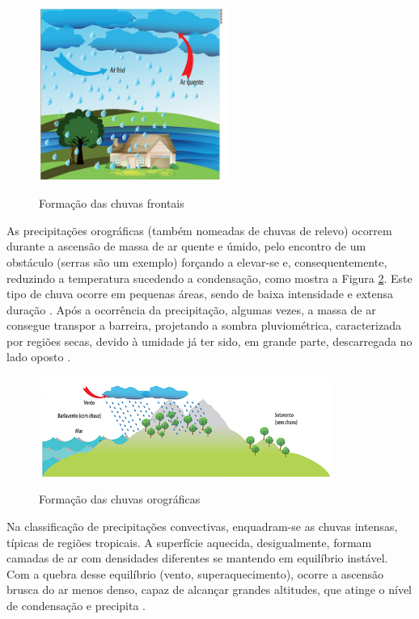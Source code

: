 \begin{figure}[h]
    \caption{Formação das chuvas frontais}
    \centering
    \includegraphics[width=0.55\textwidth]{Textuais/Figuras/chuva-frontal.png}
    \label{fig:frontal}
\end{figure}

As precipitações orográficas (também nomeadas de chuvas de relevo) ocorrem durante a ascensão de massa de ar quente e úmido, pelo encontro de um obstáculo (serras são um exemplo) forçando a elevar-se e, consequentemente, reduzindo a temperatura sucedendo a condensação, como mostra a Figura \ref{fig:orografica}. Este tipo de chuva ocorre em pequenas áreas, sendo de baixa intensidade e extensa duração \cite{ciclo-hidrologico}. Após a ocorrência da precipitação, algumas vezes, a massa de ar consegue transpor a barreira, projetando a sombra pluviométrica, caracterizada por regiões secas, devido à umidade já ter sido, em grande parte, descarregada no lado oposto \cite{chuva-orografica}.


\begin{figure}[h]
    \caption{Formação das chuvas orográficas}
    \centering
    \includegraphics[width=0.85\textwidth]{Textuais/Figuras/orografica.png}
    \label{fig:orografica}
\end{figure}

Na classificação de precipitações convectivas, enquadram-se as chuvas intensas, típicas de regiões tropicais. A superfície aquecida, desigualmente, formam camadas de ar com densidades diferentes se mantendo em equilíbrio instável. Com a quebra desse equilíbrio (vento, superaquecimento), ocorre a ascensão brusca do ar menos denso, capaz de alcançar grandes altitudes, que atinge o nível de condensação e precipita \cite{hidro-aplicada}.